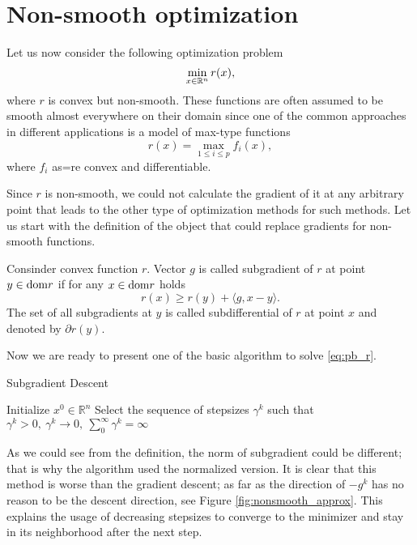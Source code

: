 \section{Non-smooth optimization}\label{sec:basics_nonsmooth}
Let us now consider the following optimization problem
\begin{equation}\label{eq:pb_r}
\min_{x\in\mathbb{R}^n} r(x),
\end{equation}
where $r$ is convex but non-smooth. {These functions are often assumed to be smooth almost everywhere on their domain since one of the common approaches in different applications is a model of max-type functions
$$
r(x) = \max_{1\leq i \leq p} f_i(x),
$$
where $f_i$ as=re convex and differentiable.
}

Since $r$ is non-smooth, we could not calculate the gradient of it at any arbitrary point that leads to the other type of optimization methods for such methods. {Let us start with the definition of the object that could replace gradients for non-smooth functions.}

\begin{definition}[Subgradient]
Consinder convex function $r$. Vector $g$ is called subgradient of $r$ at point $y\in\mathrm{dom} r$ if for any $x\in\mathrm{dom} r$ holds
\begin{equation}\label{eq:subgrad}
r(x)\geq r(y) + \langle g, x-y\rangle.
\end{equation}
The set of all subgradients at $y$ is called subdifferential of $r$ at point $x$ and denoted by $\partial r(y)$.
\end{definition}

Now we are ready to present one of the basic algorithm \cite[Chapter $3$]{nesterov-book} to solve \eqref{eq:pb_r}.

\begin{algorithm}
    \caption{Subgradient Descent}
    \label{algo:sd}
    \begin{algorithmic}
        \STATE Initialize $x^0\in\mathbb{R}^n$
        \STATE Select the sequence of stepsizes $\gamma^k$ such that
        $
            \gamma^k>0,~\gamma^k\rightarrow 0,~\sum_0^\infty \gamma^k = \infty
        $
        \ENDFOR
    \end{algorithmic}
\end{algorithm}

As we could see from the definition, the norm of subgradient could be different; that is why the algorithm used the normalized version. It is clear that this method is worse than the gradient descent; as far as the direction of $-g^k$ has no reason to be the descent direction, see Figure \ref{fig:nonsmooth_approx}. This explains the usage of decreasing stepsizes to converge to the minimizer and stay in its neighborhood after the next step.


